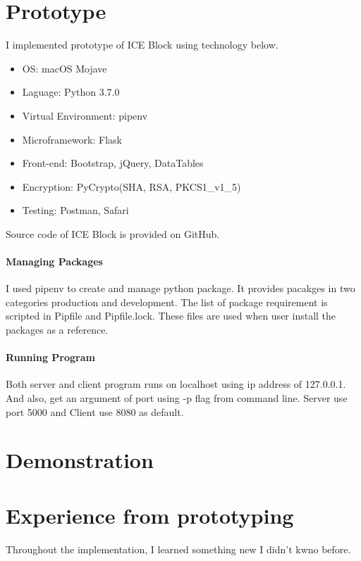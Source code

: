 \documentclass[conference]{IEEEtran}
\begin{document}
\section{Prototype}
I implemented prototype of ICE Block using technology below.

\begin{itemize}
    \item OS: macOS Mojave
    \item Laguage: Python 3.7.0
    \item Virtual Environment: pipenv
    \item Microframework: Flask
    \item Front-end: Bootstrap, jQuery, DataTables
    \item Encryption: PyCrypto(SHA, RSA, PKCS1\_v1\_5)
    \item Testing: Postman, Safari
\end{itemize}

Source code of ICE Block is provided on GitHub.\cite{r3}

\paragraph{Managing Packages}
I used pipenv to create and manage python package.
It provides pacakges in two categories production and development.
The list of package requirement is scripted in Pipfile and Pipfile.lock.
These files are used when user install the packages as a reference.  

\paragraph{Running Program}
Both server and client program runs on localhost using ip address of 127.0.0.1.
And also, get an argument of port using -p flag from command line.
Server use port 5000 and Client use 8080 as default.


\section{Demonstration}

\subsection{}



\section{Experience from prototyping}
Throughout the implementation, I learned something new I didn't kwno before.
\end{document}

